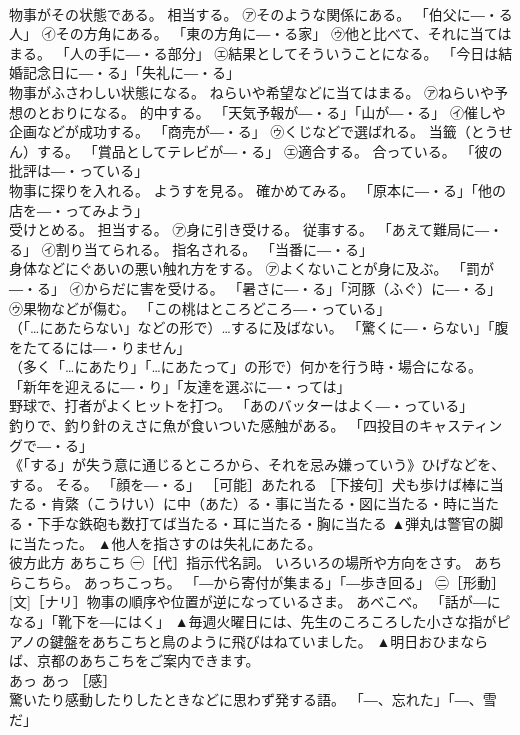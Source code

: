 \documentclass[8pt]{extreport}
\begin{document}
\begin{CJK}{UTF8}{min}
\\	物事がその状態である。 相当する。 ㋐そのような関係にある。 「伯父に―・る人」 ㋑その方角にある。 「東の方角に―・る家」 ㋒他と比べて、それに当てはまる。 「人の手に―・る部分」 ㋓結果としてそういうことになる。 「今日は結婚記念日に―・る」「失礼に―・る」 
\\	物事がふさわしい状態になる。 ねらいや希望などに当てはまる。 ㋐ねらいや予想のとおりになる。 的中する。 「天気予報が―・る」「山が―・る」 ㋑催しや企画などが成功する。 「商売が―・る」 ㋒くじなどで選ばれる。 当籤（とうせん）する。 「賞品としてテレビが―・る」 ㋓適合する。 合っている。 「彼の批評は―・っている」 
\\	物事に探りを入れる。 ようすを見る。 確かめてみる。 「原本に―・る」「他の店を―・ってみよう」 
\\	受けとめる。 担当する。 ㋐身に引き受ける。 従事する。 「あえて難局に―・る」 ㋑割り当てられる。 指名される。 「当番に―・る」 
\\	身体などにぐあいの悪い触れ方をする。 ㋐よくないことが身に及ぶ。 「罰が―・る」 ㋑からだに害を受ける。 「暑さに―・る」「河豚（ふぐ）に―・る」 ㋒果物などが傷む。 「この桃はところどころ―・っている」 
\\	（「…にあたらない」などの形で）…するに及ばない。 「驚くに―・らない」「腹をたてるには―・りません」 
\\	（多く「…にあたり」「…にあたって」の形で）何かを行う時・場合になる。 「新年を迎えるに―・り」「友達を選ぶに―・っては」 
\\	野球で、打者がよくヒットを打つ。 「あのバッターはよく―・っている」 
\\	釣りで、釣り針のえさに魚が食いついた感触がある。 「四投目のキャスティングで―・る」 
\\	《「する」が失う意に通じるところから、それを忌み嫌っていう》ひげなどを、する。 そる。 「顔を―・る」 ［可能］あたれる ［下接句］犬も歩けば棒に当たる・肯綮（こうけい）に中（あた）る・事に当たる・図に当たる・時に当たる・下手な鉄砲も数打てば当たる・耳に当たる・胸に当たる	▲弾丸は警官の脚に当たった。 ▲他人を指さすのは失礼にあたる。
\\	彼方此方	あちこち	㊀［代］指示代名詞。 いろいろの場所や方向をさす。 あちらこちら。 あっちこっち。 「―から寄付が集まる」「―歩き回る」 ㊁［形動］[文]［ナリ］物事の順序や位置が逆になっているさま。 あべこべ。 「話が―になる」「靴下を―にはく」	▲毎週火曜日には、先生のころころした小さな指がピアノの鍵盤をあちこちと鳥のように飛びはねていました。 ▲明日おひまならば、京都のあちこちをご案内できます。
\\	あっ	あっ	［感］ 
\\	驚いたり感動したりしたときなどに思わず発する語。 「―、忘れた」「―、雪だ」 

\end{CJK}
\end{document}
